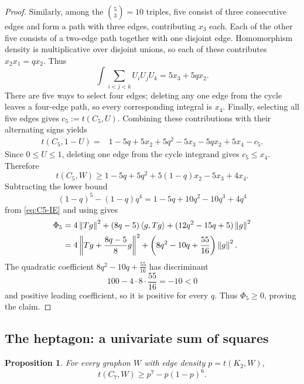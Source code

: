 \documentclass[11pt]{article}
\newtheorem{proposition}[theorem]{Proposition}
\numberwithin{equation}{section}
\newcommand{\ip}[2]{\left\langle #1,#2\right\rangle}
\newcommand{\norm}[1]{\left\lVert #1\right\rVert}
\begin{document}
\begin{proof}
  Similarly, among the $\binom53=10$ triples, five consist of three
  consecutive edges and form a path with three edges, contributing $x_3$
  each.  Each of the other five consists of a two-edge path together with one
  disjoint edge.  Homomorphism density is multiplicative over disjoint unions,
  so each of these contributes $x_2x_1=qx_2$.  Thus
  \[
    \int\sum_{i<j<k}U_iU_jU_k=5x_3+5qx_2.
  \]
  There are five ways to select four edges; deleting any one edge from the
  cycle leaves a four-edge path, so every corresponding integral is $x_4$.
  Finally, selecting all five edges gives $c_5:=t(C_5,U)$.  Combining these
  contributions with their alternating signs yields
  \begin{align*}
    t(C_5,1-U)
    ={}&1-5q+5x_2+5q^2-5x_3-5qx_2+5x_4-c_5.
  \end{align*}
  Since $0\le U\le1$, deleting one edge from the cycle integrand gives
  $c_5\le x_4$.  Therefore
  \begin{equation}\label{eq:C5-IE}
    t(C_5,W)\ge1-5q+5q^2+5(1-q)x_2-5x_3+4x_4.
  \end{equation}
  Subtracting the lower bound
  \[
    (1-q)^5-(1-q)q^4=1-5q+10q^2-10q^3+4q^4
  \]
  from \eqref{eq:C5-IE} and using  gives
  \begin{align}
    \Phi_5={}&4\norm{Tg}^2+(8q-5)\ip g{Tg}
    +(12q^2-15q+5)\norm g^2 \notag\\
    ={}&4\left\|Tg+\frac{8q-5}{8}g\right\|^2
    +\left(8q^2-10q+\frac{55}{16}\right)\norm g^2. \label{eq:Phi5}
  \end{align}
  The quadratic coefficient $8q^2-10q+\frac{55}{16}$ has discriminant
  \[
    100-4\cdot8\cdot\frac{55}{16}=-10<0
  \]
  and positive leading coefficient, so it is positive for every $q$.  Thus
  $\Phi_5\ge0$, proving the claim.
\end{proof}

\subsection{The heptagon: a univariate sum of squares}\label{subsec:C7}

\begin{proposition}\label{prop:C7}
  For every graphon $W$ with edge density $p=t(K_2,W)$,
  \[
    t(C_7,W)\ge p^7-p(1-p)^6.
  \]
\end{proposition}
\end{document}

